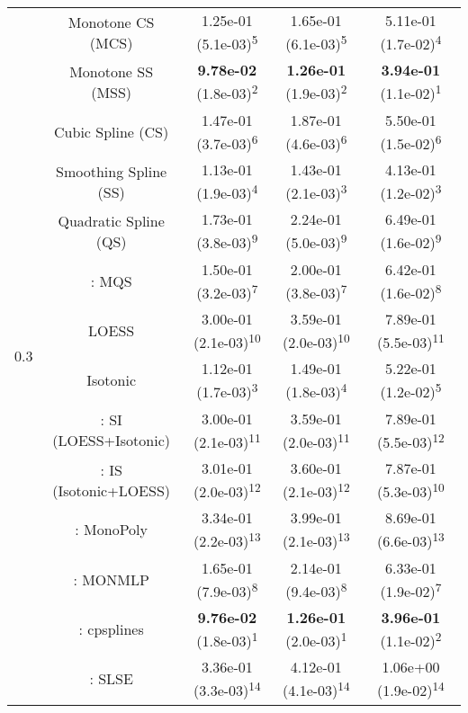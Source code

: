 \begin{tabular}{ccccc}
\midrule
\multirow{14}{*}{0.3}&Monotone CS (MCS)& 1.25e-01 (5.1e-03)\textsuperscript{5}& 1.65e-01 (6.1e-03)\textsuperscript{5}& 5.11e-01 (1.7e-02)\textsuperscript{4}\tabularnewline
&Monotone SS (MSS)& \textbf{9.78e-02} (1.8e-03)\textsuperscript{2}& \textbf{1.26e-01} (1.9e-03)\textsuperscript{2}& \textbf{3.94e-01} (1.1e-02)\textsuperscript{1}\tabularnewline
&Cubic Spline (CS)& 1.47e-01 (3.7e-03)\textsuperscript{6}& 1.87e-01 (4.6e-03)\textsuperscript{6}& 5.50e-01 (1.5e-02)\textsuperscript{6}\tabularnewline
&Smoothing Spline (SS)& 1.13e-01 (1.9e-03)\textsuperscript{4}& 1.43e-01 (2.1e-03)\textsuperscript{3}& 4.13e-01 (1.2e-02)\textsuperscript{3}\tabularnewline
&Quadratic Spline (QS)& 1.73e-01 (3.8e-03)\textsuperscript{9}& 2.24e-01 (5.0e-03)\textsuperscript{9}& 6.49e-01 (1.6e-02)\textsuperscript{9}\tabularnewline
&\textcite{heMonotoneBsplineSmoothing1998}: MQS& 1.50e-01 (3.2e-03)\textsuperscript{7}& 2.00e-01 (3.8e-03)\textsuperscript{7}& 6.42e-01 (1.6e-02)\textsuperscript{8}\tabularnewline
&LOESS& 3.00e-01 (2.1e-03)\textsuperscript{10}& 3.59e-01 (2.0e-03)\textsuperscript{10}& 7.89e-01 (5.5e-03)\textsuperscript{11}\tabularnewline
&Isotonic& 1.12e-01 (1.7e-03)\textsuperscript{3}& 1.49e-01 (1.8e-03)\textsuperscript{4}& 5.22e-01 (1.2e-02)\textsuperscript{5}\tabularnewline
&\textcite{mammenEstimatingSmoothMonotone1991}: SI (LOESS+Isotonic)& 3.00e-01 (2.1e-03)\textsuperscript{11}& 3.59e-01 (2.0e-03)\textsuperscript{11}& 7.89e-01 (5.5e-03)\textsuperscript{12}\tabularnewline
&\textcite{mammenEstimatingSmoothMonotone1991}: IS (Isotonic+LOESS)& 3.01e-01 (2.0e-03)\textsuperscript{12}& 3.60e-01 (2.1e-03)\textsuperscript{12}& 7.87e-01 (5.3e-03)\textsuperscript{10}\tabularnewline
&\textcite{murrayFastFlexibleMethods2016}: MonoPoly& 3.34e-01 (2.2e-03)\textsuperscript{13}& 3.99e-01 (2.1e-03)\textsuperscript{13}& 8.69e-01 (6.6e-03)\textsuperscript{13}\tabularnewline
&\textcite{cannonMonmlpMultilayerPerceptron2017}: MONMLP& 1.65e-01 (7.9e-03)\textsuperscript{8}& 2.14e-01 (9.4e-03)\textsuperscript{8}& 6.33e-01 (1.9e-02)\textsuperscript{7}\tabularnewline
&\textcite{navarro-garciaConstrainedSmoothingOutofrange2023}: cpsplines& \textbf{9.76e-02} (1.8e-03)\textsuperscript{1}& \textbf{1.26e-01} (2.0e-03)\textsuperscript{1}& \textbf{3.96e-01} (1.1e-02)\textsuperscript{2}\tabularnewline
&\textcite{groeneboomConfidenceIntervalsMonotone2023}: SLSE& 3.36e-01 (3.3e-03)\textsuperscript{14}& 4.12e-01 (4.1e-03)\textsuperscript{14}& 1.06e+00 (1.9e-02)\textsuperscript{14}\tabularnewline
\bottomrule
\end{tabular}

